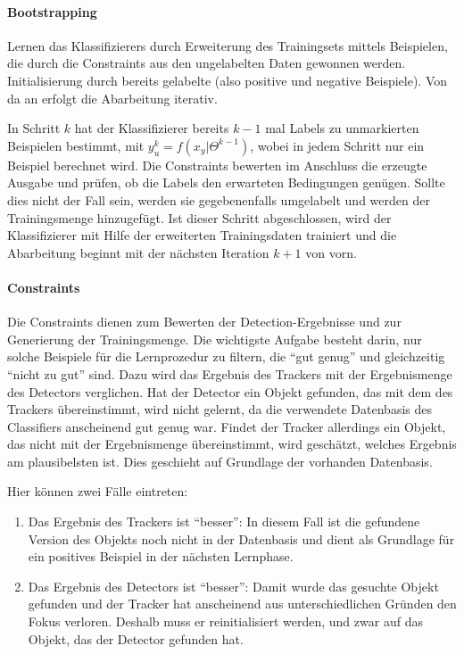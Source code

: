 	\paragraph{Bootstrapping}
	Lernen das Klassifizierers durch Erweiterung des Trainingsets mittels Beispielen, die durch die Constraints aus den ungelabelten Daten gewonnen werden. Initialisierung durch bereits gelabelte (also positive und negative Beispiele). Von da an erfolgt die Abarbeitung iterativ.

	In Schritt $k$ hat der Klassifizierer bereits $k-1$ mal Labels zu unmarkierten Beispielen bestimmt, mit $y_{u}^{k}=f(x_{y}|\Theta^{k-1})$, wobei in jedem Schritt nur ein Beispiel berechnet wird. Die Constraints bewerten im Anschluss die erzeugte Ausgabe und prüfen, ob die Labels den erwarteten Bedingungen genügen. Sollte dies nicht der Fall sein, werden sie gegebenenfalls umgelabelt und werden der Trainingsmenge hinzugefügt. Ist dieser Schritt abgeschlossen, wird der Klassifizierer mit Hilfe der erweiterten Trainingsdaten trainiert und die Abarbeitung beginnt mit der nächsten Iteration $k+1$ von vorn.

	\paragraph{Constraints}
	Die Constraints dienen zum Bewerten der Detection-Ergebnisse und zur Generierung der Trainingsmenge. Die wichtigste Aufgabe besteht darin, nur solche Beispiele für die Lernprozedur zu filtern, die ``gut genug'' und gleichzeitig ``nicht zu gut'' sind. Dazu wird das Ergebnis des Trackers mit der Ergebnismenge des Detectors verglichen. Hat der Detector ein Objekt gefunden, das mit dem des Trackers übereinstimmt, wird nicht gelernt, da die verwendete Datenbasis des Classifiers anscheinend gut genug war. Findet der Tracker allerdings ein Objekt, das nicht mit der Ergebnismenge übereinstimmt, wird geschätzt, welches Ergebnis am plausibelsten ist. Dies geschieht auf Grundlage der vorhanden Datenbasis.

	Hier können zwei Fälle eintreten:
	\begin{enumerate}
	\item Das Ergebnis des Trackers ist ``besser'': In diesem Fall ist die gefundene Version des Objekts noch nicht in der Datenbasis und dient als Grundlage für ein positives Beispiel in der nächsten Lernphase.
	\item Das Ergebnis des Detectors ist ``besser'': Damit wurde das gesuchte Objekt gefunden und der Tracker hat anscheinend aus unterschiedlichen Gründen den Fokus verloren. Deshalb muss er reinitialisiert werden, und zwar auf das Objekt, das der Detector gefunden hat.
	\end{enumerate}

